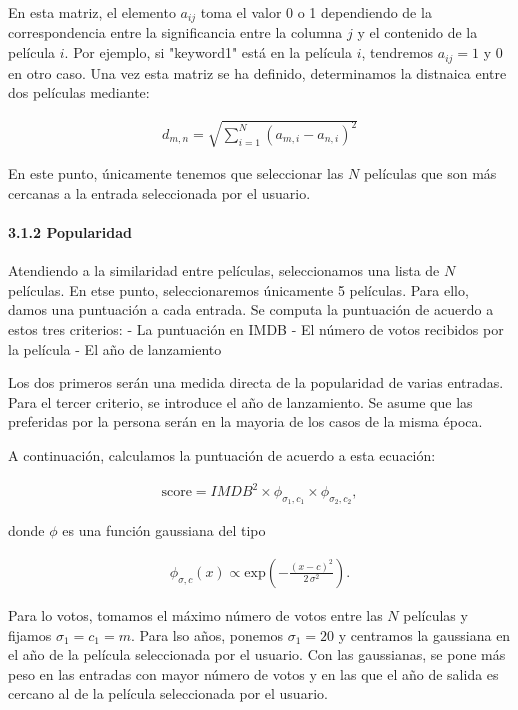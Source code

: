     En esta matriz, el elemento \(a_{ij}\) toma el valor 0 o 1 dependiendo
de la correspondencia entre la significancia entre la columna \(j\) y el
contenido de la película \(i\). Por ejemplo, si "keyword1" está en la
película \(i\), tendremos \(a_{ij} = 1\) y \(0\) en otro caso. Una vez
esta matriz se ha definido, determinamos la distnaica entre dos
películas mediante:

\begin{eqnarray}
d_{m, n} = \sqrt{  \sum_{i = 1}^{N} \left( a_{m,i}  - a_{n,i} \right)^2  } 
\end{eqnarray}

En este punto, únicamente tenemos que seleccionar las \(N\) películas
que son más cercanas a la entrada seleccionada por el usuario.

\paragraph{3.1.2 Popularidad}\label{popularidad}

Atendiendo a la similaridad entre películas, seleccionamos una lista de
\(N\) películas. En etse punto, seleccionaremos únicamente 5 películas.
Para ello, damos una puntuación a cada entrada. Se computa la puntuación
de acuerdo a estos tres criterios: - La puntuación en IMDB - El número
de votos recibidos por la película - El año de lanzamiento

Los dos primeros serán una medida directa de la popularidad de varias
entradas. Para el tercer criterio, se introduce el año de lanzamiento.
Se asume que las preferidas por la persona serán en la mayoria de los
casos de la misma época.

A continuación, calculamos la puntuación de acuerdo a esta ecuación:

    \begin{eqnarray}
\mathrm{score} = IMDB^2 \times \phi_{\sigma_1, c_1} \times  \phi_{\sigma_2, c_2},
\end{eqnarray}

donde \(\phi\) es una función gaussiana del tipo

\begin{eqnarray}
\phi_{\sigma, c}(x) \propto \mathrm{exp}\left(-\frac{(x-c)^2}{2 \, \sigma^2}\right).
\end{eqnarray}

    Para lo votos, tomamos el máximo número de votos entre las \(N\)
películas y fijamos \(\sigma_1 = c_1 = m\). Para lso años, ponemos
\(\sigma_1 = 20\) y centramos la gaussiana en el año de la película
seleccionada por el usuario. Con las gaussianas, se pone más peso en las
entradas con mayor número de votos y en las que el año de salida es
cercano al de la película seleccionada por el usuario.

